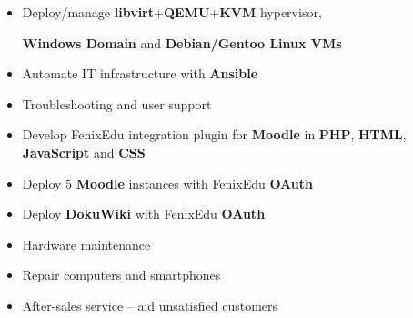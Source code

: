 \documentclass[10pt,a4paper,ragged2e,withhyper]{altacv}
\begin{document}
\begin{paracol}{2}
\begin{itemize}
\item Deploy/manage \textbf{libvirt}+\textbf{QEMU}+\textbf{KVM} hypervisor,

\textbf{Windows Domain} and \textbf{Debian/Gentoo Linux VMs}
\item Automate IT infrastructure with \textbf{Ansible}
\item Troubleshooting and user support
\item Develop FenixEdu integration plugin for \textbf{Moodle} in \textbf{PHP}, \textbf{HTML}, \textbf{JavaScript} and \textbf{CSS}
\item Deploy 5 \textbf{Moodle} instances with FenixEdu \textbf{OAuth}
\item Deploy \textbf{DokuWiki} with FenixEdu \textbf{OAuth}
\item Hardware maintenance
\end{itemize}
\divider

\begin{itemize}
\item Repair computers and smartphones
\item After-sales service -- aid unsatisfied customers
\end{itemize}

\medskip


\medskip

\\
\smallskip
{}
\\
\smallskip
{}
\\
\smallskip
{}

\switchcolumn



\end{paracol}
\end{document}
